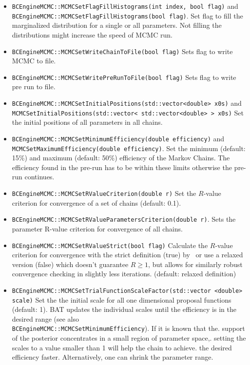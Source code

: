 \documentclass[11pt, a4paper]{article}
\begin{document}
\begin{itemize}
\item \verb|BCEngineMCMC::MCMCSetFlagFillHistograms(int index, bool flag)| and \\
  \verb|BCEngineMCMC::MCMCSetFlagFillHistograms(bool flag)|. Set flag to fill the marginalized distribution for a single or all parameters. Not filling the distributions might increase the speed of MCMC run.

\item \verb|BCEngineMCMC::MCMCSetWriteChainToFile(bool flag)| Sets
  flag to write MCMC to file.

\item \verb|BCEngineMCMC::MCMCSetWritePreRunToFile(bool flag)| Sets
  flag to write pre run to file.

\item \verb|BCEngineMCMC::MCMCSetInitialPositions(std::vector<double> x0s)|
  and \\
  \verb|MCMCSetInitialPositions(std::vector< std::vector<double> > x0s)|
  Set the initial positions of all parameters in all chains.

\item \verb|BCEngineMCMC::MCMCSetMinimumEfficiency(double efficiency)| and \\
  \verb|MCMCSetMaximumEfficiency(double efficiency)|. Set the minimum
  (default: 15\%) and maximum (default: 50\%) efficiency of the Markov
  Chains. The efficiency found in the pre-run has to be within these
  limits otherwise the pre-run continues.

\item \verb|BCEngineMCMC::MCMCSetRValueCriterion(double r)| Set the
  $R$-value criterion for convergence of a set of chains (default:
  0.1).

\item
  \verb|BCEngineMCMC::MCMCSetRValueParametersCriterion(double r)|. Sets
  the parameter R-value criterion for convergence of all chains.

\item \verb|BCEngineMCMC::MCMCSetRValueStrict(bool flag)| Calculate the
  $R$-value criterion for convergence with the strict definition (true)
  by~\cite{R_value}  or use a relaxed version (false) which doesn't guarantee
  $R \ge 1$, but allows for similarly robust convergence checking in slightly
  less iterations. (default: relaxed definition)

\item \verb|BCEngineMCMC::MCMCSetTrialFunctionScaleFactor(std::vector <double> scale)|
  Set the the initial scale for all one dimensional proposal functions (default: 1).
  BAT updates the individual scales until the efficiency is in the desired range
  (see also \\ \verb|BCEngineMCMC::MCMCSetMinimumEfficiency|). If it is known that the.
  support of the posterior concentrates in a small region of parameter space,.
  setting the scales to a value smaller than 1 will help the chain to achieve.
  the desired efficiency faster. Alternatively, one can shrink the parameter range.


\end{itemize}
\end{document}
